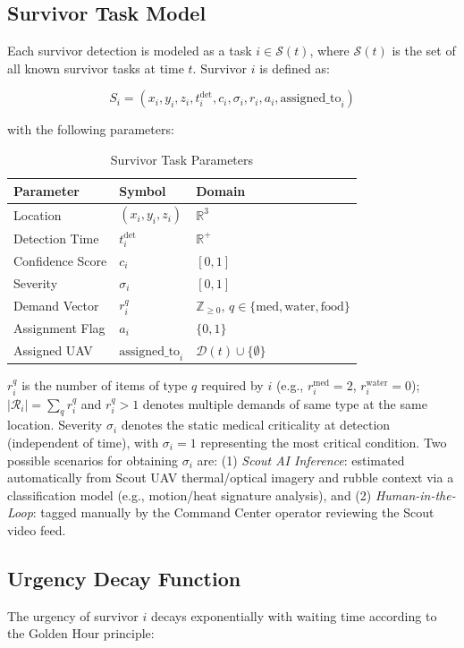 \documentclass[conference]{IEEEtran}
\begin{document}
\subsection{Survivor Task Model}
Each survivor detection is modeled as a task $i \in \mathcal{S}(t)$, where $\mathcal{S}(t)$ is the set of all known survivor tasks at time $t$. Survivor $i$ is defined as:

\begin{equation}
S_i = (x_i, y_i, z_i, t_i^{\text{det}}, c_i, \sigma_i, r_i, a_i, \text{assigned\_to}_i)
\end{equation}

with the following parameters:

\begin{table}[h]
\centering
\caption{Survivor Task Parameters}
\label{tab:survivor}
\begin{tabular}{lll}
\toprule
\textbf{Parameter} & \textbf{Symbol} & \textbf{Domain} \\
\midrule
Location & $(x_i,y_i,z_i)$ & $\mathbb{R}^3$ \\
Detection Time & $t_i^{\text{det}}$ & $\mathbb{R}^+$ \\
Confidence Score & $c_i$ & $[0,1]$ \\
Severity & $\sigma_i$ & $[0,1]$ \\
Demand Vector & $r_i^q$ & $\mathbb{Z}_{\ge0},\,q\in\{\text{med},\text{water},\text{food}\}$ \\
Assignment Flag & $a_i$ & $\{0,1\}$ \\
Assigned UAV & $\text{assigned\_to}_i$ & $\mathcal{D}(t) \cup \{\emptyset\}$ \\
\bottomrule
\end{tabular}
\end{table}
$r_i^q$ is the number of items of type $q$ required by $i$ (e.g., $r_i^{\text{med}}=2$, $r_i^{\text{water}}=0$); $|\mathcal{R}_i|=\sum_q r_i^q$ and $r_i^q>1$ denotes multiple demands of same type at the same location.
Severity $\sigma_i$ denotes the static medical criticality at detection (independent of time), with $\sigma_i=1$ representing the most critical condition. Two possible scenarios for obtaining $\sigma_i$ are: (1) \textit{Scout AI Inference}: estimated automatically from Scout UAV thermal/optical imagery and rubble context via a classification model (e.g., motion/heat signature analysis), and (2) \textit{Human-in-the-Loop}: tagged manually by the Command Center operator reviewing the Scout video feed.

\subsection{Urgency Decay Function}
The urgency of survivor $i$ decays exponentially with waiting time according to the Golden Hour principle:
\end{document}
